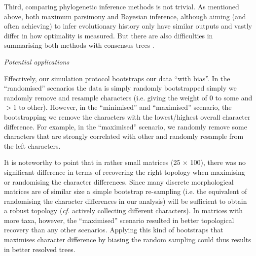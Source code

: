 \documentclass[12pt,letterpaper]{article}
\renewcommand{\subsection}[1]{%
\bigskip
\begin{center}
\begin{large}
\normalfont\itshape #1
\end{large}
\end{center}}
\begin{document}
Third, comparing phylogenetic inference methods is not trivial.
As mentioned above, both maximum parsimony and Bayesian inference, although aiming (and often achieving) to infer evolutionary history only have similar outputs and vastly differ in how optimality is measured.
But there are also difficulties in summarising both methods with consensus trees \cite{oReilly2017efficacy}.


\subsection{Potential applications}
Effectively, our simulation protocol bootstraps our data ``with bias''.
In the ``randomised'' scenarios the data is simply randomly bootstrapped simply we randomly remove and resample characters (i.e. giving the weight of $0$ to some and $>1$ to other).
However, in the ``minimised'' and ``maximised'' scenario, the bootstrapping we remove the characters with the lowest/highest overall character difference.
For example, in the ``maximised'' scenario, we randomly remove some characters that are strongly correlated with other and randomly resample from the left characters.

It is noteworthy to point that in rather small matrices (25 $\times$ 100), there was no significant difference in terms of recovering the right topology when maximising or randomising the character differences.
Since many discrete morphological matrices are of similar size \citep{guillerme2016assessment} a simple bootstrap re-sampling (i.e. the equivalent of randomising the character differences in our analysis) will be sufficient to obtain a robust topology (\textit{cf.} actively collecting different characters).
In matrices with more taxa, however, the ``maximised'' scenario resulted in better topological recovery than any other scenarios.
Applying this kind of bootstraps that maximises character difference by biasing the random sampling could thus results in better resolved trees.
\end{document}
